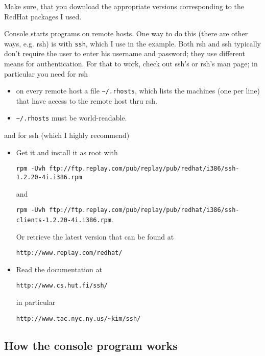 \documentclass{article}
\begin{document}
Make sure, that you download the appropriate versions corresponding to the
RedHat packages I used.

Console starts programs on remote hosts. One way to do this (there are other
ways, e.g. rsh) is with \texttt{ssh}, which I use in the example.  Both rsh
and ssh typically don't require the user to enter his username and password;
they use different means for authentication. For that to work, check out ssh's
or rsh's man page; in particular you need for rsh

\begin{itemize}
\item on every remote host a file \texttt{\~{}/.rhosts}, which lists the
  machines (one per line) that have access to the remote host thru rsh.
\item \texttt{\~{}/.rhosts} must be world-readable.
\end{itemize}

and for ssh (which I highly recommend)

\begin{itemize}
  
\item Get it and install it as root with 
  \begin{center}
    \small
    \texttt{rpm -Uvh
      ftp://ftp.replay.com/pub/replay/pub/redhat/i386/ssh-1.2.20-4i.i386.rpm}
  \end{center}
  and 
  \begin{center}
    \small
    \texttt{rpm -Uvh
      ftp://ftp.replay.com/pub/replay/pub/redhat/i386/ssh-clients-1.2.20-4i.i386.rpm}.
  \end{center}
  Or retrieve the latest version that can be found at
  \begin{center}
    \texttt{http://www.replay.com/redhat/}
  \end{center}
\item Read the documentation at
  \begin{center}
    \texttt{http://www.cs.hut.fi/ssh/}
  \end{center}
  in particular
  \begin{center}
    \texttt{http://www.tac.nyc.ny.us/\~{}kim/ssh/}
  \end{center}
\end{itemize}

\subsection{How the console program works}
\end{document}
